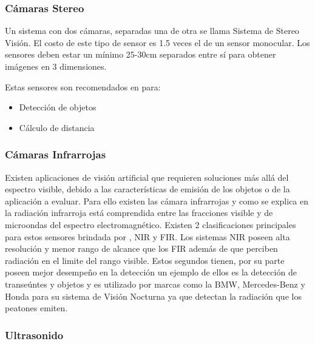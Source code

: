 \vspace{-0.50cm}
\subsubsection{Cámaras Stereo}

Un sistema con dos cámaras, separadas una de otra se llama Sistema de Stereo Visión. El costo de este tipo de sensor es 1.5 veces el de un sensor monocular. Los sensores deben estar un mínimo 25-30cm separados entre sí para obtener imágenes en 3 dimensiones\cite{Dubey2016}.

Estas sensores son recomendados en \cite{Dubey2016} para: 
\begin{multicols}{2}
\begin{itemize}
    \item {Detección de objetos}
\end{itemize}
\begin{itemize}
    \item {Cálculo de distancia}
\end{itemize}
\end{multicols}

\vspace{-0.50cm}
\subsubsection{Cámaras Infrarrojas}

Existen aplicaciones de visión artificial que requieren soluciones más allá del espectro visible, debido a las características de emisión de los objetos o de la aplicación a evaluar. Para ello existen las cámara infrarrojas y como se explica en \cite{Alava2010} la radiación
infrarroja está comprendida entre las fracciones visible y de microondas del espectro electromagnético. 
Existen 2 clasificaciones principales para estos sensores brindada por \cite{Kallhammer2006}, NIR y FIR. Los sistemas NIR poseen alta resolución y menor rango de alcance que los FIR además de que perciben radiación en el limite del rango visible. Estos segundos tienen, por su parte poseen mejor desempeño en la detección un ejemplo de ellos es la detección de transeúntes y objetos y es utilizado por marcas como la BMW, Mercedes-Benz y Honda para su sistema de Visión Nocturna ya que detectan la radiación que los peatones emiten.  


\subsubsection{Ultrasonido}

